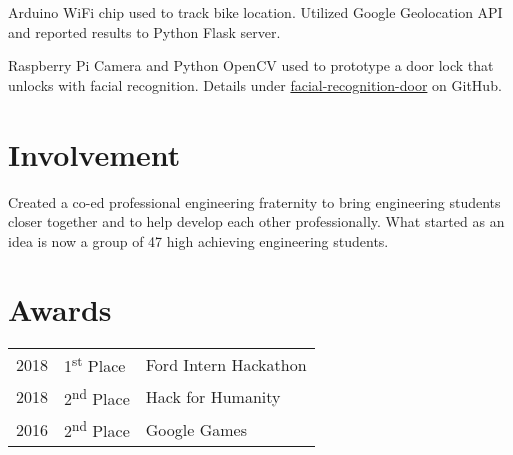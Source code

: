 \documentclass[]{deedy-resume-openfont}
\begin{document}
\begin{minipage}[t]{0.66\textwidth}
\begin{tightemize}
\item Arduino WiFi chip used to track bike location. Utilized Google Geolocation API and reported results to Python Flask server.
\end{tightemize}
\sectionsep

\begin{tightemize}
\item Raspberry Pi Camera and Python OpenCV used to prototype a door lock that unlocks with facial recognition. Details under {\href{https://github.com/zachbellay/facial-recognition-door}{facial-recognition-door}}  on GitHub.
\end{tightemize}
\sectionsep





\section{Involvement}
\begin{tightemize}
\item Created a co-ed professional engineering fraternity to bring
engineering students closer together and to help develop each other
professionally. What started as an idea is now a group of 47 high achieving
engineering students. 
\end{tightemize}
\sectionsep


\section{Awards} 
\begin{tabular}{rll}
2018	     & 1\textsuperscript{st} Place  & Ford Intern Hackathon\\
2018	     & 2\textsuperscript{nd} Place  & Hack for Humanity\\
2016	     & 2\textsuperscript{nd} Place  & Google Games\\
\end{tabular}
\sectionsep


\end{minipage} 
\end{document}
